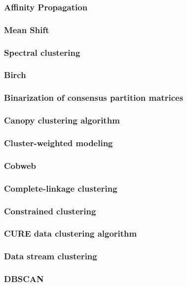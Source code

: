 \documentclass{VUMIFInfKursinis}
\begin{document}
\subsubsection{Affinity Propagation}
\subsubsection{Mean Shift}
\subsubsection{Spectral clustering}
\subsubsection{Birch}


\subsubsection{Binarization of consensus partition matrices}
\subsubsection{Canopy clustering algorithm}
\subsubsection{Cluster-weighted modeling}
\subsubsection{Cobweb}
\subsubsection{Complete-linkage clustering}
\subsubsection{Constrained clustering}
\subsubsection{CURE data clustering algorithm}
\subsubsection{Data stream clustering}
\subsubsection{DBSCAN}
\end{document}
